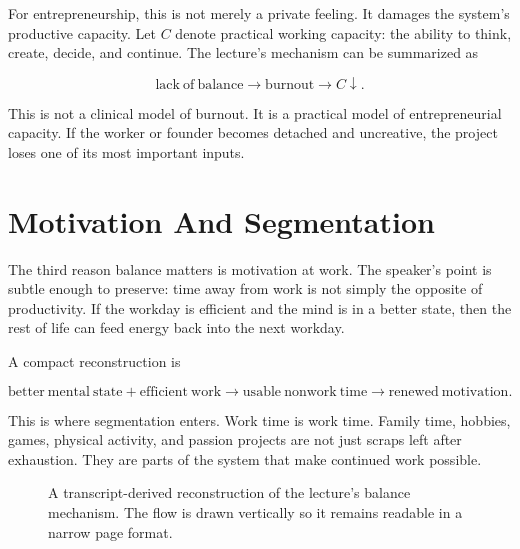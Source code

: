 For entrepreneurship, this is not merely a private feeling. It damages the system's productive capacity. Let \(C\) denote practical working capacity: the ability to think, create, decide, and continue. The lecture's mechanism can be summarized as

\begin{equation}
\mathrm{lack\ of\ balance}
\longrightarrow
\mathrm{burnout}
\longrightarrow
C \downarrow .
\end{equation}

This is not a clinical model of burnout. It is a practical model of entrepreneurial capacity. If the worker or founder becomes detached and uncreative, the project loses one of its most important inputs.

\section{Motivation And Segmentation}

The third reason balance matters is motivation at work. The speaker's point is subtle enough to preserve: time away from work is not simply the opposite of productivity. If the workday is efficient and the mind is in a better state, then the rest of life can feed energy back into the next workday.

A compact reconstruction is

\begin{equation}
\mathrm{better\ mental\ state}
+
\mathrm{efficient\ work}
\longrightarrow
\mathrm{usable\ nonwork\ time}
\longrightarrow
\mathrm{renewed\ motivation}.
\end{equation}

This is where segmentation enters. Work time is work time. Family time, hobbies, games, physical activity, and passion projects are not just scraps left after exhaustion. They are parts of the system that make continued work possible.

\begin{figure}
\centering
{}
\caption{A transcript-derived reconstruction of the lecture's balance mechanism. The flow is drawn vertically so it remains readable in a narrow page format.}
\end{figure}

